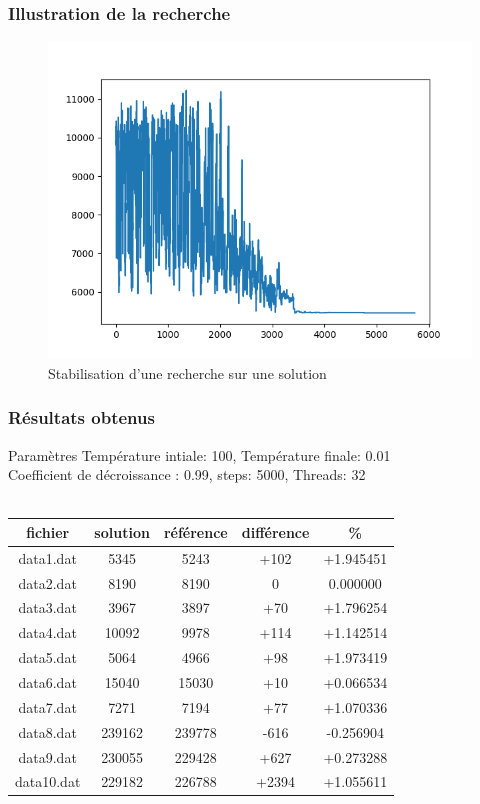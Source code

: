 \documentclass{beamer}
\begin{document}
\begin{frame}
    \frametitle{Illustration de la recherche}
    \begin{figure}
        \includegraphics[width=\linewidth]{Figure_1.png}
        \caption{Stabilisation d'une recherche sur une solution}
    \end{figure}
\end{frame}


\begin{frame}
    \frametitle{Résultats obtenus}
    \begin{block}{Paramètres}
    Température intiale: 100, Température finale: 0.01 \\
    Coefficient de décroissance : 0.99, steps: 5000, Threads: 32
    \\~\\
        \centering
        \begin{tabular}{|c|c|c|c|c|}
            \hline
            fichier & solution & référence & différence & \% \\
            \hline
            \hline
            data1.dat & 5345 & 5243 & +102 & +1.945451 \\
            data2.dat & 8190 & 8190 & 0 & 0.000000 \\
            data3.dat & 3967 & 3897 & +70 & +1.796254 \\  
            data4.dat & 10092 & 9978 & +114 & +1.142514 \\ 
            data5.dat & 5064 & 4966 & +98 & +1.973419 \\  
            data6.dat & 15040 & 15030 & +10 & +0.066534 \\
            data7.dat & 7271 & 7194 & +77 & +1.070336 \\
            data8.dat & 239162 & 239778 & -616 & -0.256904 \\
            data9.dat & 230055 & 229428 & +627 & +0.273288 \\
            data10.dat & 229182 & 226788 & +2394 & +1.055611 \\
            \hline
        \end{tabular}
    \end{block}
    
\end{frame}
\end{document}
